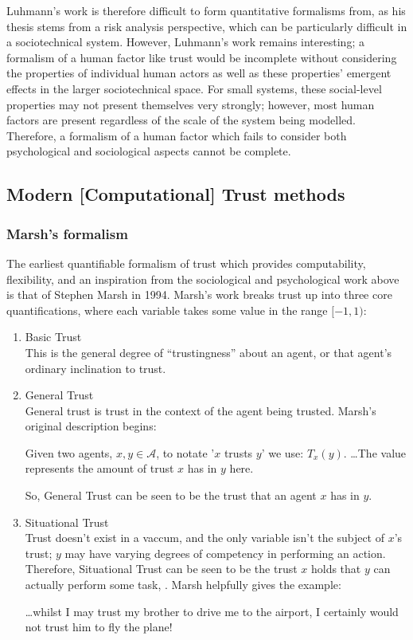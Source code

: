 Luhmann's work is therefore difficult to form quantitative formalisms from, as his thesis stems from a risk analysis perspective, which can be particularly difficult in a sociotechnical system. However, Luhmann's work remains interesting; a formalism of a human factor like trust would be incomplete without considering the properties of individual human actors as well as these properties' emergent effects in the larger sociotechnical space. For small systems, these social-level properties may not present themselves very strongly; however, most human factors are present regardless of the scale of the system being modelled. Therefore, a formalism of a human factor which fails to consider both psychological and sociological aspects cannot be complete. \par


\subsection{Modern [Computational] Trust methods}
\subsubsection{Marsh's formalism}
The earliest quantifiable formalism of trust which provides computability, flexibility, and an inspiration from the sociological and psychological work above is that of Stephen Marsh in 1994\cite{Marsh1994FormalisingConcept}. Marsh's work breaks trust up into three core quantifications, where each variable takes some value in the range \({[-1,1)}\):
\begin{enumerate}
    \item Basic Trust \\
    This is the general degree of ``trustingness'' about an agent, or that agent's ordinary inclination to trust.
    \item General Trust \\
    General trust is trust in the context of the agent being trusted. Marsh's original description begins\cite{Marsh1994FormalisingConcept}:
    \begin{displayquote}
        Given two agents, \(x, y \in \mathcal{A}\), to notate '\(x\) trusts \(y\)'  we use: \(T_{x}(y)\). {\ldots}The value represents the amount of trust \(x\) has in \(y\) here.
    \end{displayquote}
    So, General Trust can be seen to be the trust that an agent \(x\) has in \(y\).
    \item Situational Trust \\
    Trust doesn't exist in a vaccum, and the only variable isn't the subject of \(x\)'s trust; \(y\) may have varying degrees of competency in performing an action. Therefore, Situational Trust can be seen to be the trust \(x\) holds that \(y\) can actually perform some task, \safealpha. Marsh helpfully gives the example\cite{Marsh1994FormalisingConcept}:
    \begin{displayquote}
        {\ldots}whilst I may trust my brother to drive me to the airport, I certainly would not trust him to fly the plane!
    \end{displayquote}
\end{enumerate}


